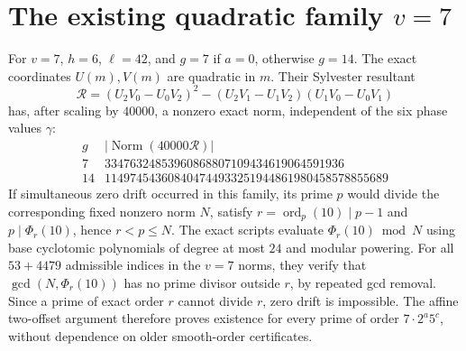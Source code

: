 \documentclass[10pt]{article}
\DeclareMathOperator{\ord}{ord}
\DeclareMathOperator{\Norm}{Norm}
\begin{document}
\section{The existing quadratic family \(v=7\)}
For \(v=7\), \(h=6\), \(\ell=42\), and
\(g=7\) if \(a=0\), otherwise \(g=14\).
The exact coordinates \(U(m),V(m)\) are quadratic in \(m\).
Their Sylvester resultant
\[
\mathcal R=(U_2V_0-U_0V_2)^2-
  (U_2V_1-U_1V_2)(U_1V_0-U_0V_1)
\]
has, after scaling by \(40000\), a nonzero exact norm,
independent of the six phase values \(\gamma\):
\[
\begin{array}{c|l}
g&|\Norm(40000\mathcal R)|\\\hline
7&33476324853960868807109434619064591936\\
14&114974543608404744933251944861980458578855689
\end{array}
\]
If simultaneous zero drift occurred in this family,
its prime \(p\) would divide the corresponding fixed nonzero
norm \(N\), satisfy \(r=\ord_p(10)\mid p-1\) and
\(p\mid\Phi_r(10)\), hence \(r<p\le N\).
The exact scripts evaluate \(\Phi_r(10)\bmod N\) using
base cyclotomic polynomials of degree at most \(24\)
and modular powering. For all \(53+4479\) admissible indices
in the \(v=7\) norms, they verify that
\(\gcd(N,\Phi_r(10))\) has no prime divisor outside \(r\),
by repeated gcd removal. Since a prime of exact order \(r\)
cannot divide \(r\), zero drift is impossible.
The affine two-offset argument therefore proves existence for every
prime of order \(7\cdot2^a5^c\), without dependence on older smooth-order
certificates.
\end{document}
